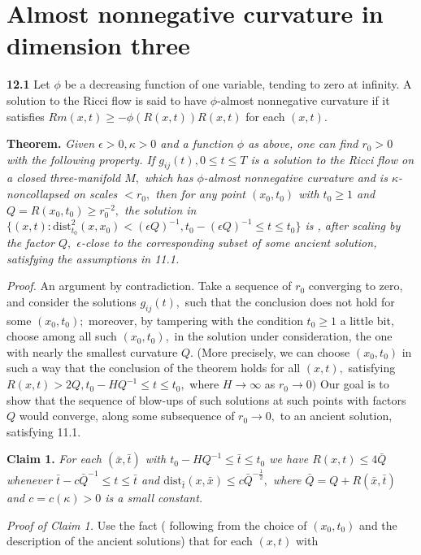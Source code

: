 \documentclass[12pt]{article}
\newcommand{\e}{\epsilon}
\newcommand{\bx}{\bar{x}}
\newcommand{\bt}{\bar{t}}
\theoremstyle{plain}
{\swapnumbers
\newtheorem{thm}{Theorem}[section]
\newtheorem{cor}[thm]{Corollary}
\newtheorem{lem}[thm]{Lemma}
\newtheorem{prop}[thm]{Proposition}
}
\theoremstyle{definition}
{\swapnumbers
\newtheorem{defn}[thm]{Definition}
\newtheorem{nota}[thm]{Notation}
\newtheorem{parag}[thm]{}
\newtheorem*{parstr}{\addtocounter{thm}{1}\thesection.\arabic{thm}*}
\newtheorem*{intropar}{\addtocounter{thm}{1}\arabic{thm}}
}
\theoremstyle{remark} {\swapnumbers
\newtheorem{rem}[thm]{Remark}
\newtheorem{exam}[thm]{Example}
\newtheorem{lemma}[thm]{Lemma}
\newtheorem{claim}[thm]{Claim}
}
\numberwithin{equation}{section}
\begin{document}
    \section {Almost nonnegative curvature in dimension three}
    {\bf 12.1} Let $\phi $ be a decreasing function of one variable, tending to
    zero at infinity. A solution to the Ricci flow is said to have
    $\phi$-almost nonnegative curvature if it satisfies
    $Rm(x,t)\ge -\phi (R(x,t))R(x,t)$ for each $(x,t).$
    \par {\bf Theorem.} {\it Given $\e>0,\kappa>0$ and a function $\phi$ as
    above, one can find $r_0>0$ with the following property. If
    $g_{ij}(t), 0\le t\le T$ is a solution to the Ricci flow on a
    closed three-manifold $M,$ which has $\phi$-almost nonnegative
    curvature and is $\kappa$-noncollapsed on scales $<r_0,$ then
    for any point $(x_0,t_0)$ with $t_0\ge 1$ and $Q=R(x_0,t_0)\ge
    r_0^{-2},$ the solution in
    $\{(x,t):\mbox{dist}^2_{t_0}(x,x_0)<(\e Q)^{-1}, t_0-(\e
    Q)^{-1}\le t\le t_0\}$ is , after scaling by the factor $Q,$
    $\e$-close to the corresponding subset of some ancient
    solution, satisfying the assumptions in 11.1.} \par {\it Proof.}  An
    argument by contradiction. Take a sequence of $r_0$ converging
    to zero, and consider the solutions $g_{ij}(t),$ such that the
    conclusion does not hold for some $(x_0,t_0);$ moreover, by
    tampering with the condition $t_0\ge 1$ a little bit,
    choose among all such $(x_0,t_0),$ in the solution under consideration, the one with nearly the smallest
    curvature $Q.$ (More precisely, we can
    choose $(x_0,t_0)$ in such a way that the conclusion of
    the theorem holds for all $(x,t),$ satisfying $R(x,t)>2Q, t_0-HQ^{-1}\le t\le t_0,$
    where $H\to\infty $ as $r_0\to 0)$  Our goal is to show that the sequence of
    blow-ups of such solutions at such points with factors $Q$
    would converge, along some subsequence of $r_0\to 0,$ to an
    ancient solution, satisfying 11.1.
    \par {\bf Claim 1.} {\it  For each $(\bx,\bt)$ with $t_0-HQ^{-1}\le \bt \le t_0$
    we have $R(x,t)\le 4\bar{Q}$ whenever $\bt-c\bar{Q}^{-1}\le
    t\le \bt$ and $\mbox{dist}_{\bt}(x,\bx)\le
    c\bar{Q}^{-\frac{1}{2}},$ where $\bar{Q}=Q+R(\bx,\bt)$ and
    $c=c(\kappa)>0$ is a small constant.} \par {\it Proof of Claim 1.}  Use the fact
    ( following from the choice of $(x_0,t_0)$ and the description
    of the ancient solutions) that for each $(x,t)$ with
\end{document}

